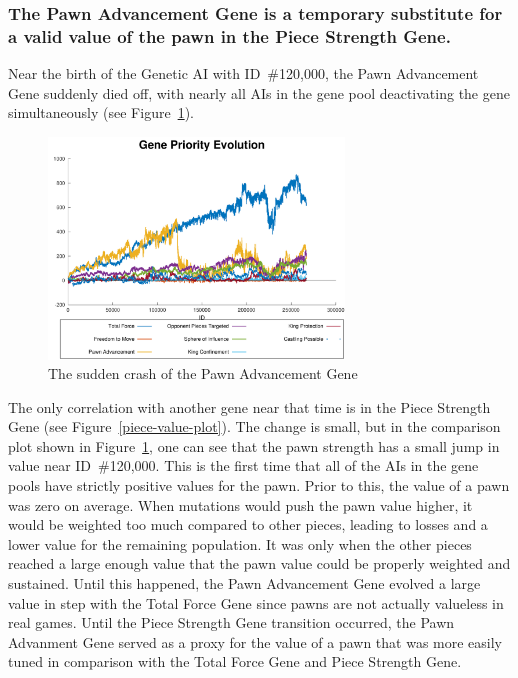 \documentclass[letterpaper]{article}
\renewcommand{\_}{\allowbreak\textunderscore\allowbreak}
\begin{document}
\subsubsection{The Pawn Advancement Gene is a temporary substitute for a valid value of the pawn in the Piece Strength Gene.}\label{pawn-result}

Near the birth of the Genetic AI with ID~\#120,000, the Pawn Advancement Gene suddenly died off, with nearly all AIs in the gene pool deactivating the gene simultaneously (see Figure~\ref{pawn-crash}).
\begin{figure}[htb]
	\centering
	\includegraphics[width=0.7\textwidth]{pawn-advancement-crash}
	\caption{The sudden crash of the Pawn Advancement Gene}\label{pawn-crash}
\end{figure}

The only correlation with another gene near that time is in the Piece Strength Gene (see Figure~\ref{piece-value-plot}). The change is small, but in the comparison plot shown in Figure~\ref{pawn-crash}, one can see that the pawn strength has a small jump in value near ID~\#120,000. This is the first time that all of the AIs in the gene pools have strictly positive values for the pawn. Prior to this, the value of a pawn was zero on average. When mutations would push the pawn value higher, it would be weighted too much compared to other pieces, leading to losses and a lower value for the remaining population. It was only when the other pieces reached a large enough value that the pawn value could be properly weighted and sustained. Until this happened, the Pawn Advancement Gene evolved a large value in step with the Total Force Gene since pawns are not actually valueless in real games. Until the Piece Strength Gene transition occurred, the Pawn Advanment Gene served as a proxy for the value of a pawn that was more easily tuned in comparison with the Total Force Gene and Piece Strength Gene.
\end{document}
